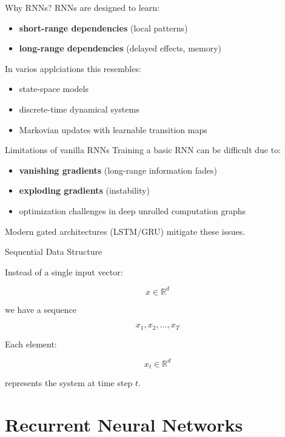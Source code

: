 \documentclass{beamer}
\begin{document}
\begin{frame}{Why RNNs?}
RNNs are designed to learn:
\begin{itemize}
\item \textbf{short-range dependencies} (local patterns)
\item \textbf{long-range dependencies} (delayed effects, memory)
\end{itemize}

In varios applciations this resembles:
\begin{itemize}
\item state-space models
\item discrete-time dynamical systems
\item Markovian updates with learnable transition maps
\end{itemize}
\end{frame}

\begin{frame}{Limitations of vanilla RNNs}
Training a basic RNN can be difficult due to:
\begin{itemize}
\item \textbf{vanishing gradients} (long-range information fades)
\item \textbf{exploding gradients} (instability)
\item optimization challenges in deep unrolled computation graphs
\end{itemize}

Modern gated architectures (LSTM/GRU) mitigate these issues.
\end{frame}



\begin{frame}{Sequential Data Structure}

Instead of a single input vector:

\[
x \in \mathbb{R}^d
\]

we have a sequence

\[
x_1,x_2,\dots,x_T
\]

Each element:

\[
x_t \in \mathbb{R}^d
\]

represents the system at time step \(t\).
\end{frame}

\section{Recurrent Neural Networks}
\end{document}
